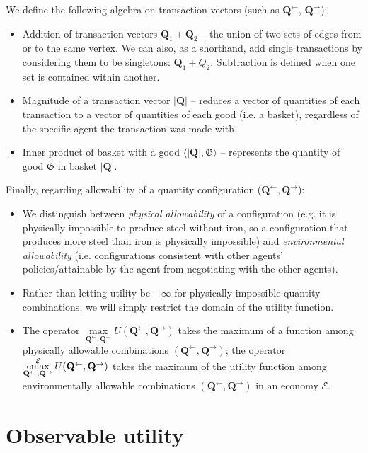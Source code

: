 \documentclass[smallextended]{svjour3}
\newcommand{\economy}{\ensuremath{\mathcal{E}}}
\newcommand{\emax}{\ensuremath{\operatornamewithlimits{emax}}}
\newcommand{\quants}{\ensuremath{Q}} %
\newcommand{\quantl}{\ensuremath{\mathbf{Q}}} %
\newcommand{\good}{\ensuremath{\mathfrak{G}}}
\newcommand{\utility}{\ensuremath{U}}
\begin{document}
We define the following algebra on transaction vectors (such as $\quantl^\leftarrow$, $\quantl^\rightarrow$):
\begin{itemize}
    \item Addition of transaction vectors $\quantl_1 + \quantl_2$ -- the union of two sets of edges from or to the same vertex. We can also, as a shorthand, add single transactions by considering them to be singletons: $\quantl_1+\quants_2$. Subtraction is defined when one set is contained within another.
    \item Magnitude of a transaction vector $|\quantl|$ -- reduces a vector of quantities of each transaction to a vector of quantities of each good (i.e. a basket), regardless of the specific agent the transaction was made with.
    \item Inner product of basket with a good $\langle |\quantl|, \good\rangle$ -- represents the quantity of good $\good$ in basket $|\quantl|$.
\end{itemize}

Finally, regarding allowability of a quantity configuration ($\quantl^\leftarrow, \quantl^\rightarrow$): 

\begin{itemize}
    \item We distinguish between \emph{physical allowability} of a configuration (e.g. it is physically impossible to produce steel without iron, so a configuration that produces more steel than iron is physically impossible) and \emph{environmental allowability} (i.e. configurations consistent with other agents' policies/attainable by the agent from negotiating with the other agents).
    \item Rather than letting utility be $-\infty$ for physically impossible quantity combinations, we will simply restrict the domain of the utility function. 
    \item The operator $\max\limits_{\quantl^\leftarrow, \quantl^\rightarrow} \utility(\quantl^\leftarrow, \quantl^\rightarrow)$ takes the maximum of a function among physically allowable combinations $(\quantl^\leftarrow, \quantl^\rightarrow)$; the operator $\emax\limits_{\quantl^\leftarrow, \quantl^\rightarrow}^\economy \utility(\quantl^\leftarrow, \quantl^\rightarrow)$ takes the maximum of the utility function among environmentally allowable combinations $(\quantl^\leftarrow, \quantl^\rightarrow)$ in an economy $\economy$.
\end{itemize} 

\section{Observable utility}
\label{sec:main}
\end{document}
